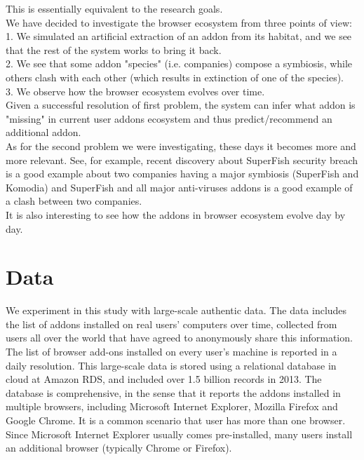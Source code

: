 \documentclass[11pt,oneside]{book}
\let\Oldsection\section
\renewcommand{\section}{\FloatBarrier\Oldsection}
\begin{document}
This is essentially equivalent to the research goals.\\
We have decided to investigate the browser ecosystem from three points of view:\\
1. We simulated an artificial extraction of an addon from its habitat, and we see that the rest of the system works to bring it back.\\
2. We see that some addon "species" (i.e. companies) compose a symbiosis, while others clash with each other (which results in extinction of one of the species).\\
3. We observe how the browser ecosystem evolves over time.\\
Given a successful resolution of first problem, the system can infer what addon is "missing" in current user addons ecosystem and thus predict/recommend an additional addon.\\
As for the second problem we were investigating, these days it becomes more and more relevant. See, for example, recent discovery about SuperFish security breach is a good example about two companies having a major symbiosis (SuperFish and Komodia) and SuperFish and all major anti-viruses addons is a good example of a clash between two companies.\\
It is also interesting to see how the addons in browser ecosystem evolve day by day.



\chapter{Data}
\label{sec:datasets}

We experiment in this study with large-scale authentic data.  The data includes the list of addons installed on real users' computers over time, collected from users all over the world that have agreed to anonymously share this information.  The list of browser add-ons installed on every user's machine is reported in a daily resolution.  This large-scale data is stored using a relational database in cloud at Amazon RDS, and included over 1.5 billion records in 2013. The database is comprehensive, in the sense that it  reports the addons installed in multiple browsers, including Microsoft Internet  Explorer, Mozilla Firefox and Google Chrome. It  is a common scenario that user has more than one browser. Since Microsoft Internet Explorer usually comes pre-installed, many users install an additional browser (typically Chrome or Firefox).
\end{document}
